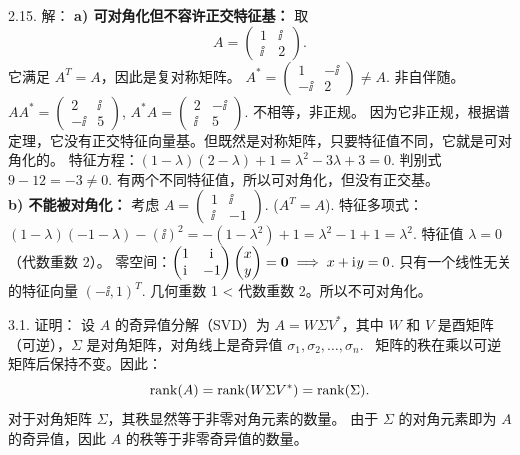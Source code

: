 \begin{exer}
2.15. 解：
\textbf{a) 可对角化但不容许正交特征基：}
取
$$A=\begin{pmatrix}1&\ii\\ \ii&2\end{pmatrix}.$$
它满足 $A^T=A$，因此是复对称矩阵。
$A^* = \begin{pmatrix} 1 & -\ii \\ -\ii & 2 \end{pmatrix} \neq A$. 非自伴随。
$AA^* = \begin{pmatrix} 2 & \ii \\ -\ii & 5 \end{pmatrix}$, $A^*A = \begin{pmatrix} 2 & -\ii \\ \ii & 5 \end{pmatrix}$. 不相等，非正规。
因为它非正规，根据谱定理，它没有正交特征向量基。但既然是对称矩阵，只要特征值不同，它就是可对角化的。
特征方程：$(1-\lambda)(2-\lambda) + 1 = \lambda^2 - 3\lambda + 3 = 0$. 判别式 $9-12 = -3 \neq 0$. 有两个不同特征值，所以可对角化，但没有正交基。
\\
\textbf{b) 不能被对角化：}
考虑 $A = \begin{pmatrix} 1 & \ii \\ \ii & -1 \end{pmatrix}$. ($A^T = A$).
特征多项式：$(1-\lambda)(-1-\lambda) - (\ii)^2 = -(1-\lambda^2) + 1 = \lambda^2 - 1 + 1 = \lambda^2$.
特征值 $\lambda = 0$（代数重数 2）。
零空间：$\begin{pmatrix} 1 & \mathrm{i}\mkern1mu \\ \mathrm{i}\mkern1mu & -1 \end{pmatrix} \begin{pmatrix} x \\ y \end{pmatrix} = \mathbf{0} \implies x + \mathrm{i}\mkern1mu y = 0$.
只有一个线性无关的特征向量 $(-\ii, 1)^T$.
几何重数 1 < 代数重数 2。所以不可对角化。

\vspace{5ex}

3.1. 证明：
设 $A$ 的奇异值分解（SVD）为 $A = W \Sigma V^*$，其中 $W$ 和 $V$ 是酉矩阵（可逆），$\Sigma$ 是对角矩阵，对角线上是奇异值 $\sigma_1, \sigma_2, \dots, \sigma_n$.~
矩阵的秩在乘以可逆矩阵后保持不变。因此：
$$ \operatorname{rank}(A) = \operatorname{rank}(W \Sigma V^*) = \operatorname{rank}(\Sigma). $$
对于对角矩阵 $\Sigma$，其秩显然等于非零对角元素的数量。
由于 $\Sigma$ 的对角元素即为 $A$ 的奇异值，因此 $A$ 的秩等于非零奇异值的数量。


\end{exer}
